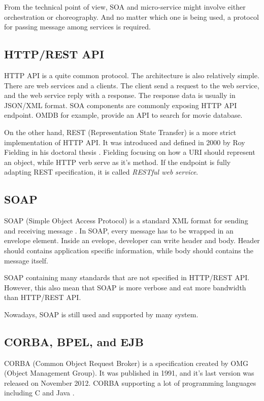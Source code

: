 \documentclass[conference]{IEEEtran}
\begin{document}
From the technical point of view, SOA and micro-service might involve either orchestration or choreography. And no matter which one is being used, a protocol for passing message among services is required.

\subsection{HTTP/REST API}

HTTP API is a quite common protocol. The architecture is also relatively simple. There are web services and a clients. The client send a request to the web service, and the web service reply with a response. The response data is usually in JSON/XML format. SOA components are commonly exposing HTTP API endpoint. OMDB for example, provide an API to search for movie database.

On the other hand, REST (Representation State Transfer) is a more strict implementation of HTTP API. It was introduced and defined in 2000 by Roy Fielding in his doctoral thesis \cite{Fielding:2000:PDM:337180.337228}. Fielding focusing on how a URI should represent an object, while HTTP verb serve as it's method. If the endpoint is fully adapting REST specification, it is called {\it RESTful web service}.

\subsection{SOAP}

SOAP (Simple Object Access Protocol) is a standard XML format for sending and receiving message \cite{soap}. In SOAP, every message has to be wrapped in an envelope element. Inside an evelope, developer can write header and body. Header should contains application specific information, while body should contains the message itself.

SOAP containing many standards that are not specified in HTTP/REST API. However, this also mean that SOAP is more verbose and eat more bandwidth than HTTP/REST API.

Nowadays, SOAP is still used and supported by many system.

\subsection{CORBA, BPEL, and EJB}

CORBA (Common Object Request Broker) is a specification created by OMG (Object Management Group). It was published in 1991, and it's last version was released on November 2012. CORBA supporting a lot of programming languages including C and Java \cite{corba}.
\end{document}
